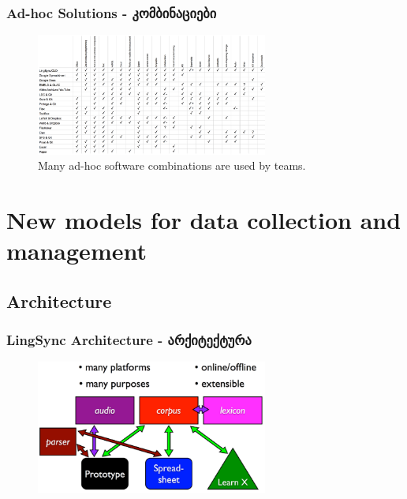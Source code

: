 \documentclass{beamer}
\begin{document}
\begin{frame}
\frametitle{Ad-hoc Solutions - კომბინაციები}

\begin{figure}
\begin{center}
\includegraphics[width=3in]{../figures/other_software}
\caption{Many ad-hoc software combinations are used by teams.}
\label{allothersoftware}
\end{center}
\end{figure}

\end{frame}


\section[LingSync]{New models for data collection and management}
\subsection{Architecture}\label{sec:lingsync}



\begin{frame}
\frametitle{LingSync Architecture - არქიტექტურა}
\begin{figure}
\begin{center}
\includegraphics[width=3in]{../figures/architecture}
\label{lingsync:architecture}
\end{center}
\end{figure}
\end{frame}
\end{document}
